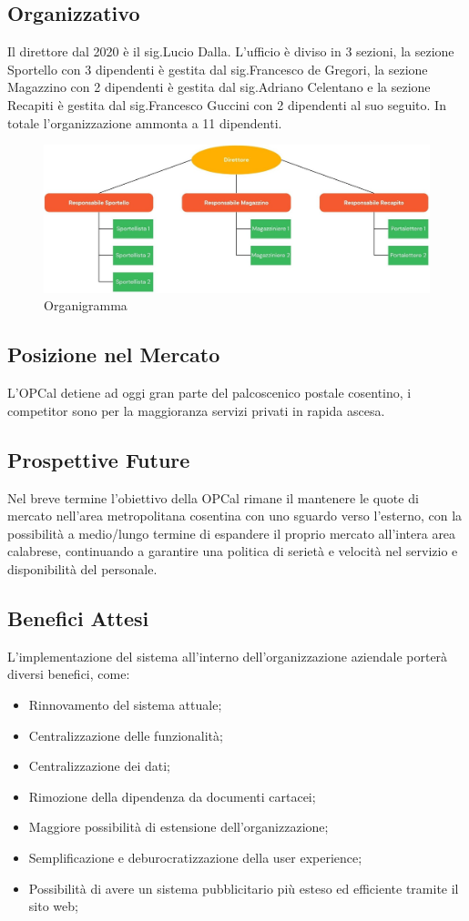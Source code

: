 \documentclass{article}
\begin{document}
\subsection{Organizzativo}
Il direttore dal 2020 è il sig.Lucio Dalla. L'ufficio è diviso in 3 sezioni, la sezione Sportello con 3 dipendenti è gestita dal sig.Francesco de Gregori, la sezione Magazzino con 2 dipendenti è gestita dal sig.Adriano Celentano e la sezione Recapiti è gestita dal sig.Francesco Guccini con 2 dipendenti al suo seguito. In totale l'organizzazione ammonta a 11 dipendenti.
\begin{figure}[h]
  \centering
  \includegraphics[width=0.8\linewidth]{assets/organigramma.jpg}
  \caption{Organigramma}
  \label{fig:enter_label}
\end{figure}
\subsection{Posizione nel Mercato}
L'OPCal detiene ad oggi gran parte del palcoscenico postale cosentino, i competitor sono per la maggioranza servizi privati in rapida ascesa.
\subsection{Prospettive Future}
Nel breve termine l'obiettivo della OPCal rimane il mantenere le quote di mercato nell'area metropolitana cosentina con uno sguardo verso l'esterno, con la possibilità a medio/lungo termine di espandere il proprio mercato all'intera area calabrese, continuando a garantire una politica di serietà e velocità nel servizio e disponibilità del personale. 
\subsection{Benefici Attesi}
L'implementazione del sistema all'interno dell'organizzazione aziendale porterà diversi benefici, come: 
\begin{itemize}
  \item Rinnovamento del sistema attuale;
  \item Centralizzazione delle funzionalità;
  \item Centralizzazione dei dati;
  \item Rimozione della dipendenza da documenti cartacei;
  \item Maggiore possibilità di estensione dell'organizzazione;
  \item Semplificazione e deburocratizzazione della user experience;
  \item Possibilità di avere un sistema pubblicitario più esteso ed efficiente tramite il sito web; 

\end{itemize}
\end{document}
